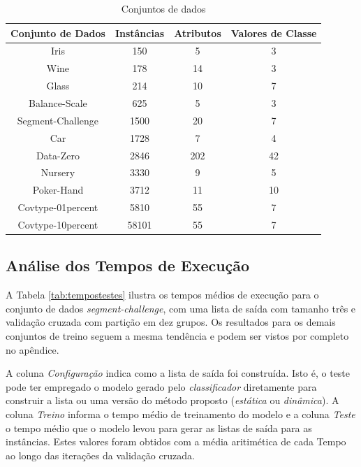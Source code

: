 \begin{table}[h!]
  \begin{center}
    \begin{tabular}{cccc}
      \hline
      \textbf{Conjunto de Dados} & \textbf{Instâncias} & \textbf{Atributos} & \textbf{Valores de Classe} \\
      \hline

      Iris & 150 & 5 & 3 \\
      Wine & 178 & 14 & 3 \\ 
      Glass & 214 & 10 & 7 \\
      Balance-Scale & 625 & 5 & 3 \\
      Segment-Challenge & 1500 & 20 & 7 \\
      Car & 1728 & 7 & 4 \\
      Data-Zero & 2846 & 202 & 42 \\
      Nursery & 3330 & 9 & 5 \\
      Poker-Hand & 3712 & 11 & 10 \\      
      Covtype-01percent & 5810 & 55 & 7 \\
      Covtype-10percent & 58101 & 55 & 7 \\    

      \hline
    \end{tabular}
    \caption{Conjuntos de dados}
    \label{tab:datasets}
  \end{center}
\end{table}

\subsection{Análise dos Tempos de Execução}

A Tabela \ref{tab:tempostestes} ilustra os tempos médios de execução para o conjunto de dados \textit{segment-challenge}, com uma lista de saída com tamanho três e validação cruzada com partição em dez grupos.
Os resultados para os demais conjuntos de treino seguem a mesma tendência e podem ser vistos por completo no apêndice.

A coluna \textit{Configuração} indica como a lista de saída foi construída.
Isto é, o teste pode ter empregado o modelo gerado pelo \textit{classificador} diretamente para construir a lista ou uma versão do método proposto (\textit{estática} ou \textit{dinâmica}).
A coluna \textit{Treino} informa o tempo médio de treinamento do modelo e a coluna \textit{Teste} o tempo médio que o modelo levou para gerar as listas de saída para as instâncias.
Estes valores foram obtidos com a média aritimética de cada Tempo ao longo das iterações da validação cruzada.


